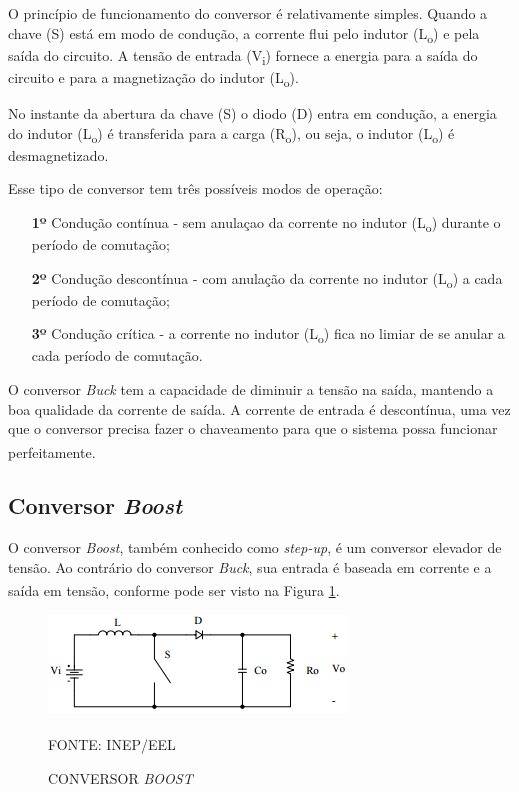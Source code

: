 \documentclass[
	12pt,				%
	openright,			%
	oneside,			%
	a4paper,			%
	english,			%
	french,				%
	spanish,			%
	brazil,				%
	oldfontcommands
	]{abntex2}
\begin{document}
	O princípio de funcionamento do conversor é relativamente simples. Quando a chave (S) está em modo de condução, a corrente flui pelo indutor (L\textsubscript{o}) e pela saída do circuito. A tensão de entrada (V\textsubscript{i}) fornece a energia para a saída do circuito e para a magnetização do indutor (L\textsubscript{o}).
	
	No instante da abertura da chave (S) o diodo (D) entra em condução, a energia do indutor (L\textsubscript{o}) é transferida para a carga (R\textsubscript{o}), ou seja, o indutor (L\textsubscript{o}) é desmagnetizado.
	
	Esse tipo de conversor tem três possíveis modos de operação:
	
	\begin{itemize} 
		\item[\textbf{1º}] Condução contínua - sem anulaçao da corrente no indutor (L\textsubscript{o}) durante o período de comutação;
		\item[\textbf{2º}] Condução descontínua - com anulação da corrente no indutor (L\textsubscript{o}) a cada período de comutação;
		\item[\textbf{3º}] Condução crítica - a corrente no indutor (L\textsubscript{o}) fica no limiar de se anular a cada período de comutação.
	\end{itemize}
	
	O conversor \textit{Buck} tem a capacidade de diminuir a tensão na saída, mantendo a boa qualidade da corrente de saída. A corrente de entrada é descontínua, uma vez que o conversor precisa fazer o chaveamento para que o sistema possa funcionar perfeitamente.\textsuperscript{\cite{inep}}
	
\subsection[Conversor Boost]{Conversor \textit{Boost}}

	O conversor \textit{Boost}, também conhecido como \textit{step-up}, é um conversor elevador de tensão. Ao contrário do conversor \textit{Buck}, sua entrada é baseada em corrente e a saída em tensão, conforme pode ser visto na Figura \ref{Fig_boost}.\textsuperscript{\cite{inep}}

 	\begin{figure}[th]
		\caption{CONVERSOR \textit{BOOST}}
		\label{Fig_boost}
		\centering
		\includegraphics[width=0.75\linewidth]{./figs/boost}
			
		\begin{small}
			FONTE: INEP/EEL\textsuperscript{\cite{inep}}
		\end{small}		
	\end{figure}
	\pagebreak
	
\end{document}
